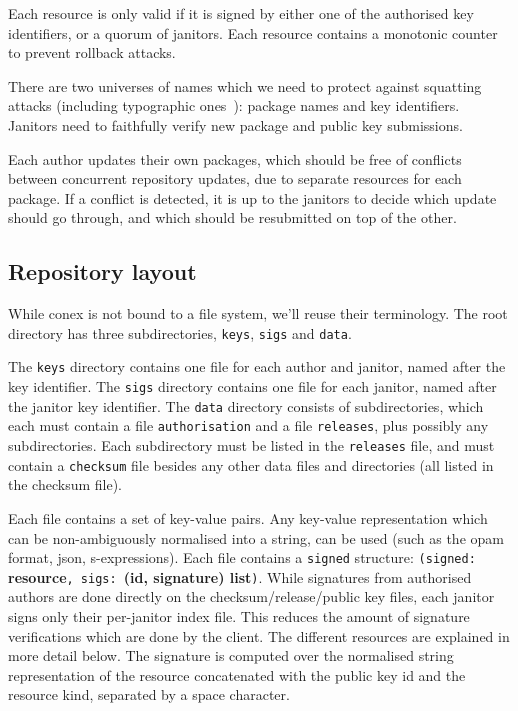 \documentclass[nocopyrightspace]{sigplanconf}
\begin{document}
Each resource is only valid if it is signed by either one of the authorised key identifiers, or a quorum of janitors.
Each resource contains a monotonic counter to prevent rollback attacks.

There are two universes of names which we need to protect against squatting attacks (including typographic ones~\cite{typo}): package names and key identifiers.
Janitors need to faithfully verify new package and public key submissions.

Each author updates their own packages, which should be free of conflicts between concurrent repository updates, due to separate resources for each package.
If a conflict is detected, it is up to the janitors to decide which update should go through, and which should be resubmitted on top of the other.

\subsection{Repository layout}
While conex is not bound to a file system, we'll reuse their terminology.
The root directory has three subdirectories, \texttt{keys}, \texttt{sigs} and \texttt{data}.

The \texttt{keys} directory contains one file for each author and janitor, named after the key identifier.
The \texttt{sigs} directory contains one file for each janitor, named after the janitor key identifier.
The \texttt{data} directory consists of subdirectories, which each must contain a file \texttt{authorisation} and a file \texttt{releases}, plus possibly any subdirectories.
Each subdirectory must be listed in the \texttt{releases} file, and must contain a \texttt{checksum} file besides any other data files and directories (all listed in the checksum file).

Each file contains a set of key-value pairs.
Any key-value representation which can be non-ambiguously normalised into a string, can be used (such as the opam format, json, s-expressions).
Each file contains a \texttt{signed} structure: \texttt{(signed: }\textbf{resource}\texttt{, sigs: }\textbf{(id, signature) list}\texttt{)}.
While signatures from authorised authors are done directly on the checksum/release/public key files, each janitor signs only their per-janitor index file.
This reduces the amount of signature verifications which are done by the client.
The different resources are explained in more detail below.
The signature is computed over the normalised string representation of the resource concatenated with the public key id and the resource kind, separated by a space character.
\end{document}

